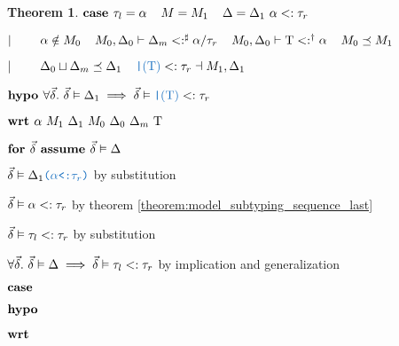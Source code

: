 \documentclass[acmsmall]{acmart}
\theoremstyle{definition}
\newtheorem{theorem}{Theorem}[section]
\begin{document}
\begin{theorem}
    \item \Z $\textbf{case } 
      \tau_l = \alpha
      \hspace{4mm}
      M = M_1
      \hspace{4mm}
      \Delta = \Delta_1\ \alpha <: \tau_r
    $
    \item \Z $|\ \ \ \ \ \ \ 
      \alpha \notin M_0
      \hspace{4mm}
      M_0, \Delta_0 \vdash \Delta_m <:^\sharp \alpha \slash \tau_r
      \hspace{4mm}
      M_0, \Delta_0 \vdash \mathrm{T} <:^\dagger \alpha
      \hspace{4mm}
      M_0 \preceq M_1
    $
    \item \Z $\contin
      \Delta_0 \sqcup \Delta_m \preceq \Delta_1
      \I
      \obj{|$(\Tau)$} <: \tau_r \given M_1, \Delta_1
    $
    \item \Z $\B{hypo } \forall \vec{\delta} .\ \vec{\delta} \satisfies \Delta_1 \implies
      \vec{\delta} \satisfies \obj{|$(\Tau)$} <: \tau_r
    $
    \item \Z $\B{wrt } \alpha\ M_1\ \Delta_1\ M_0\ \Delta_0\ \Delta_m\ \Tau$
      \item \Z\Z $\textbf{for } \vec{\delta} \textbf{ assume } \vec{\delta} \vDash \Delta$
        \item \Z\Z\Z $\vec{\delta} \satisfies \Delta_1 \obj{($\alpha$<:$\tau_r$)}$ by substitution
        \item \Z\Z\Z $\vec{\delta} \vDash \alpha <: \tau_r$ by theorem \ref{theorem:model_subtyping_sequence_last} 
        \item \Z\Z\Z $\vec{\delta} \vDash \tau_l <: \tau_r$ by substitution 
      \item \Z\Z $\forall \vec{\delta} .\ \vec{\delta} \vDash \Delta \implies \vec{\delta} \vDash \tau_l <: \tau_r$ 
      by implication and generalization 
      \item \Z\Z {} 

    \item \Z $\textbf{case } $
    \item \Z $\textbf{hypo } $
    \item \Z $\textbf{wrt } $
      \item \Z\Z {} 


\end{theorem}
\end{document}
